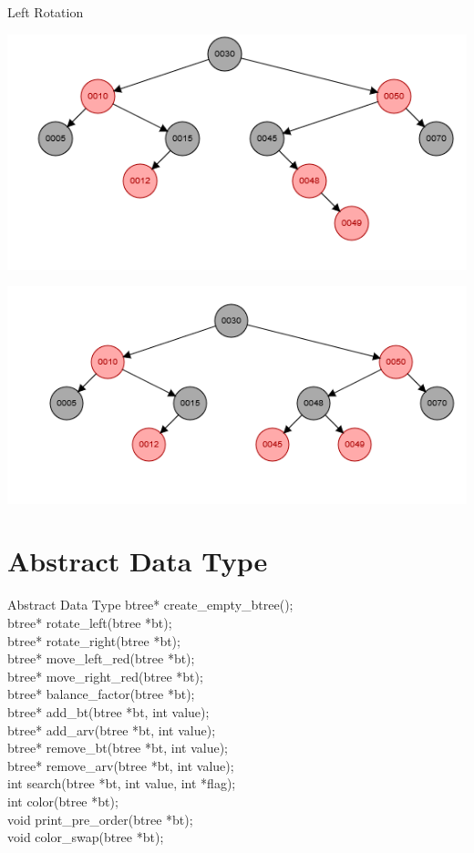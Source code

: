 \documentclass{beamer}
\begin{document}
\begin{frame}{Left Rotation}
\begin{left}
\includegraphics[scale=0.5]{RR1.png}
\end{left}
\begin{right}
\includegraphics[scale=0.5]{RR2.png}
\end{right}
\end{frame}

\section{Abstract Data Type}
\begin{frame}{Abstract Data Type}
btree* create\_empty\_btree();\\
btree* rotate\_left(btree *bt);\\
btree* rotate\_right(btree *bt);\\
btree* move\_left\_red(btree *bt);\\
btree* move\_right\_red(btree *bt);\\
btree* balance\_factor(btree *bt);\\
btree* add\_bt(btree *bt, int value);\\
btree* add\_arv(btree *bt, int value);\\
btree* remove\_bt(btree *bt, int value);\\
btree* remove\_arv(btree *bt, int value);\\
int search(btree *bt, int value, int *flag);\\
int color(btree *bt);\\
void print\_pre\_order(btree *bt);\\
void color\_swap(btree *bt);
\end{frame}
\end{document}
